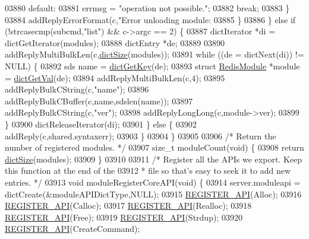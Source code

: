 \begin{DoxyCode}
{{{{{{{{{{{{{{{{{{03880             \textcolor{keywordflow}{default}:
03881                 errmsg = \textcolor{stringliteral}{"operation not possible."};
03882                 \textcolor{keywordflow}{break};
03883             \}
03884             addReplyErrorFormat(c,\textcolor{stringliteral}{"Error unloading module: %
03885         \}
03886     \} \textcolor{keywordflow}{else} \textcolor{keywordflow}{if} (!strcasecmp(subcmd,\textcolor{stringliteral}{"list"}) && c->argc == 2) \{
03887         dictIterator *di = dictGetIterator(modules);
03888         dictEntry *de;
03889 
03890         addReplyMultiBulkLen(c,\hyperlink{dict_8h_af193430dd3d5579a52b194512f72c1f0}{dictSize}(modules));
03891         \textcolor{keywordflow}{while} ((de = dictNext(di)) != NULL) \{
03892             sds name = \hyperlink{dict_8h_a3271c334309904a3086deca94f96e46e}{dictGetKey}(de);
03893             \textcolor{keyword}{struct} \hyperlink{structRedisModule}{RedisModule} *module = \hyperlink{dict_8h_ae8d2cc391873b2bea2b87c4f80f43120}{dictGetVal}(de);
03894             addReplyMultiBulkLen(c,4);
03895             addReplyBulkCString(c,\textcolor{stringliteral}{"name"});
03896             addReplyBulkCBuffer(c,name,sdslen(name));
03897             addReplyBulkCString(c,\textcolor{stringliteral}{"ver"});
03898             addReplyLongLong(c,module->ver);
03899         \}
03900         dictReleaseIterator(di);
03901     \} \textcolor{keywordflow}{else} \{
03902         addReply(c,shared.syntaxerr);
03903     \}
03904 \}
03905 
03906 \textcolor{comment}{/* Return the number of registered modules. */}
03907 size\_t moduleCount(\textcolor{keywordtype}{void}) \{
03908     \textcolor{keywordflow}{return} \hyperlink{dict_8h_af193430dd3d5579a52b194512f72c1f0}{dictSize}(modules);
03909 \}
03910 
03911 \textcolor{comment}{/* Register all the APIs we export. Keep this function at the end of the}
03912 \textcolor{comment}{ * file so that's easy to seek it to add new entries. */}
03913 \textcolor{keywordtype}{void} moduleRegisterCoreAPI(\textcolor{keywordtype}{void}) \{
03914     server.moduleapi = dictCreate(&moduleAPIDictType,NULL);
03915     \hyperlink{module_8c_a38783dad7766982759c7d417a8ab9211}{REGISTER\_API}(Alloc);
03916     \hyperlink{module_8c_a38783dad7766982759c7d417a8ab9211}{REGISTER\_API}(Calloc);
03917     \hyperlink{module_8c_a38783dad7766982759c7d417a8ab9211}{REGISTER\_API}(Realloc);
03918     \hyperlink{module_8c_a38783dad7766982759c7d417a8ab9211}{REGISTER\_API}(Free);
03919     \hyperlink{module_8c_a38783dad7766982759c7d417a8ab9211}{REGISTER\_API}(Strdup);
03920     \hyperlink{module_8c_a38783dad7766982759c7d417a8ab9211}{REGISTER\_API}(CreateCommand);
}}}}}}}}}}}}}}}}}}}
\end{DoxyCode}

